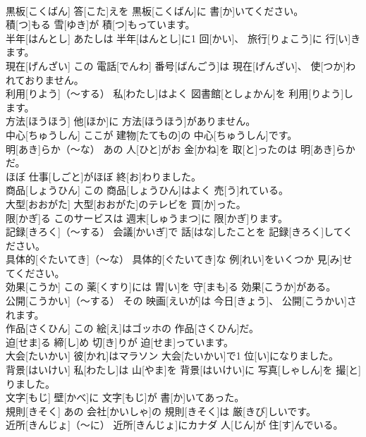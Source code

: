 \documentclass[8pt]{extreport}
\begin{document}
\begin{CJK}{UTF8}{min}
\\	黒板[こくばん]	答[こた]えを 黒板[こくばん]に 書[か]いてください。		
\\	積[つ]もる	雪[ゆき]が 積[つ]もっています。		
\\	半年[はんとし]	あたしは 半年[はんとし]に1 回[かい]、 旅行[りょこう]に 行[い]きます。		
\\	現在[げんざい]	この 電話[でんわ] 番号[ばんごう]は 現在[げんざい]、 使[つか]われておりません。		
\\	利用[りよう]（～する）	私[わたし]はよく 図書館[としょかん]を 利用[りよう]します。		
\\	方法[ほうほう]	他[ほか]に 方法[ほうほう]がありません。		
\\	中心[ちゅうしん]	ここが 建物[たてもの]の 中心[ちゅうしん]です。		
\\	明[あき]らか（～な）	あの 人[ひと]がお 金[かね]を 取[と]ったのは 明[あき]らかだ。		
\\	ほぼ	仕事[しごと]がほぼ 終[お]わりました。		
\\	商品[しょうひん]	この 商品[しょうひん]はよく 売[う]れている。		
\\	大型[おおがた]	大型[おおがた]のテレビを 買[か]った。		
\\	限[かぎ]る	このサービスは 週末[しゅうまつ]に 限[かぎ]ります。		
\\	記録[きろく]（～する）	会議[かいぎ]で 話[はな]したことを 記録[きろく]してください。		
\\	具体的[ぐたいてき]（～な）	具体的[ぐたいてき]な 例[れい]をいくつか 見[み]せてください。		
\\	効果[こうか]	この 薬[くすり]には 胃[い]を 守[まも]る 効果[こうか]がある。		
\\	公開[こうかい]（～する）	その 映画[えいが]は 今日[きょう]、 公開[こうかい]されます。		
\\	作品[さくひん]	この 絵[え]はゴッホの 作品[さくひん]だ。		
\\	迫[せま]る	締[し]め 切[き]りが 迫[せま]っています。		
\\	大会[たいかい]	彼[かれ]はマラソン 大会[たいかい]で1 位[い]になりました。		
\\	背景[はいけい]	私[わたし]は 山[やま]を 背景[はいけい]に 写真[しゃしん]を 撮[と]りました。		
\\	文字[もじ]	壁[かべ]に 文字[もじ]が 書[か]いてあった。		
\\	規則[きそく]	あの 会社[かいしゃ]の 規則[きそく]は 厳[きび]しいです。		
\\	近所[きんじょ]（～に）	近所[きんじょ]にカナダ 人[じん]が 住[す]んでいる。		

\end{CJK}
\end{document}

